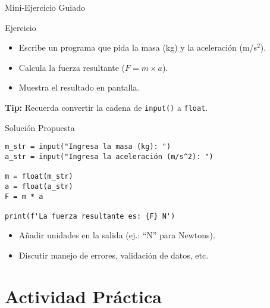 \documentclass[10pt]{beamer}
\begin{document}
\begin{frame}{Mini-Ejercicio Guiado}
\begin{block}{Ejercicio}
  \begin{itemize}
    \item Escribe un programa que pida la masa (kg) y la aceleración (m/s\(^2\)).
    \item Calcula la fuerza resultante (\(F = m \times a\)).
    \item Muestra el resultado en pantalla.
  \end{itemize}
\end{block}
\textbf{Tip:} Recuerda convertir la cadena de \texttt{input()} a \texttt{float}.
\end{frame}

\begin{frame}[fragile]{Solución Propuesta}
\begin{verbatim}
m_str = input("Ingresa la masa (kg): ")
a_str = input("Ingresa la aceleración (m/s^2): ")

m = float(m_str)
a = float(a_str)
F = m * a

print(f'La fuerza resultante es: {F} N')
\end{verbatim}
\begin{itemize}
  \item Añadir unidades en la salida (ej.: “N” para Newtons).
  \item Discutir manejo de errores, validación de datos, etc.
\end{itemize}
\end{frame}

\section{Actividad Práctica}
\end{document}
